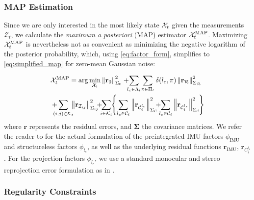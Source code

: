\subsubsection{MAP Estimation}
\label{sssec:map_estimation}
Since we are only interested in the most likely state $\calX_t$ given the measurements $\mathcal{Z}_t$, we calculate the \emph{maximum a posteriori} (MAP) estimator $\calX_t^{\text{MAP}}$.
Maximizing $\calX_t^{\text{MAP}}$ is nevertheless not as convenient as minimizing the negative logarithm of the posterior probability, which, using \cref{eq:factor_form}, simplifies to \cref{eq:simplified_map} for zero-mean Gaussian noise:

\begin{equation}
  \begin{split}
   &\calX_t^{\text{MAP}} = \arg\min_{\calX_t} \normsq{\mathbf{r}_0}{\Sigma_0} + \!\!\!\sum_{l_c\in\Lambda_t}\!\sum_{\pi\in\Pi_t}\delta(l_c, \pi)\normsq{\mathbf{r}_{\mathcal{R}}}{\Sigma_{\mathcal{R}}} \\
                  &+ \!\!\!\!\!\sum_{(i,j)\in\calK_t}\!\!\!\normsq{\mathbf{r}_{\measimu_\subimu}}{\Sigma_{ij}} \!\!\! + \!\!\! \sum_{i\in\calK_t}\!\!\Bigg\{\!\sum_{l_c\in\meascam_i} \normsq{\mathbf{r}_{\mathcal{C}_{i}^{l_c}}}{\Sigma_\mathcal{C}} \!\!\! + \!\!\! \sum_{l_s\in\meascam_i} \normsq{\mathbf{r}_{\mathcal{C}_{i}^{l_s}}}{\Sigma_\mathcal{C}}\!\!\Bigg\} \\
  \end{split}
  \label{eq:simplified_map}
\end{equation}
where $\mathbf{r}$ represents the residual errors, and $\mathbf{\Sigma}$ the covariance matrices.
We refer the reader to \cite[Sec. VI, VII]{Forster17troOnmanifold} for the actual formulation of the preintegrated IMU factors $\phi_{\text{IMU}}$ and structureless factors $\phi_{l_s}$, as well as the underlying residual functions $\mathbf{r}_{\text{IMU}}$, $\mathbf{r}_{C_i^{l_s}}$.
For the projection factors $\phi_{l_c}$, we use a standard monocular and stereo reprojection error formulation as in \cite{Carlone17icra-vioAttention}.

\subsubsection{Regularity Constraints}
\label{sssec:regularity_constraints}

